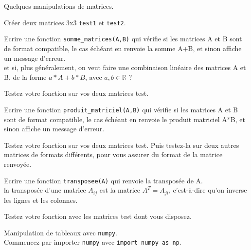 

\exo
Quelques manipulations de matrices.

\ques Créer deux matrices 3x3 \verb!test1! et \verb!test2!.

\quessques Ecrire une fonction \verb!somme_matrices(A,B)! qui vérifie si les matrices A et B sont de format compatible, le cas échéant en renvoie la somme A+B, et sinon affiche un message d'erreur. \\

 et si, plus généralement, on veut faire une combinaison linéaire des matrices A et B, de la forme $a*A + b*B$, avec $a,b \in \mathds{R} $ ?

\ssques Testez votre fonction sur vos deux matrices test.

\quessques Ecrire une fonction \verb!produit_matriciel(A,B)! qui vérifie si les matrices A et B sont de format compatible, le cas échéant en renvoie le produit matriciel A*B, et sinon affiche un message d'erreur.

\ssques Testez votre fonction sur vos deux matrices test. Puis testez-la sur deux autres matrices de formats différents, pour vous assurer du format de la matrice renvoyée.

\quessques Ecrire une fonction \verb!transposee(A)! qui renvoie la transposée de A. \\
 la transposée d'une matrice $A_{ij}$ est la matrice $A^T = A_{ji}$, c'est-à-dire qu'on inverse les lignes et les colonnes.

\ssques Testez votre fonction avec les matrices test dont vous disposez.

\exo
Manipulation de tableaux avec \verb!numpy!. \\
Commencez par importer \verb!numpy! avec \verb!import numpy as np!. \\


